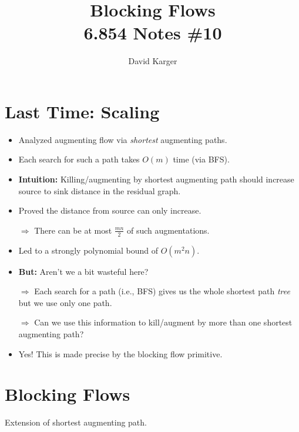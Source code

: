\documentclass{article}
\title{Blocking Flows\\ 6.854 Notes \#10}
\author{David Karger}
\begin{document}
\section{Last Time: Scaling}

\begin{itemize}
\item Analyzed augmenting flow via {\em shortest} augmenting paths.
\item Each search for such a path takes $O(m)$ time (via BFS).
\item \textbf{Intuition:} Killing/augmenting by shortest augmenting path should increase source to sink distance in the residual graph.
\item Proved the distance from source can only increase.

$\Rightarrow$ There can be at most $\frac{mn}{2}$ of such augmentations. 
\item Led to a strongly polynomial bound of $O(m^2n)$.
\item \textbf{But:} Aren't we a bit wasteful here?

$\Rightarrow$ Each search for a path (i.e., BFS) gives us the whole shortest path {\em tree} but we use only one path. 

$\Rightarrow$ Can we use this information to kill/augment by more than one shortest augmenting path?

\item Yes! This is made precise by the blocking flow primitive.
\end{itemize}

\section{Blocking Flows} %

Extension of shortest augmenting path.\\
\end{document}
